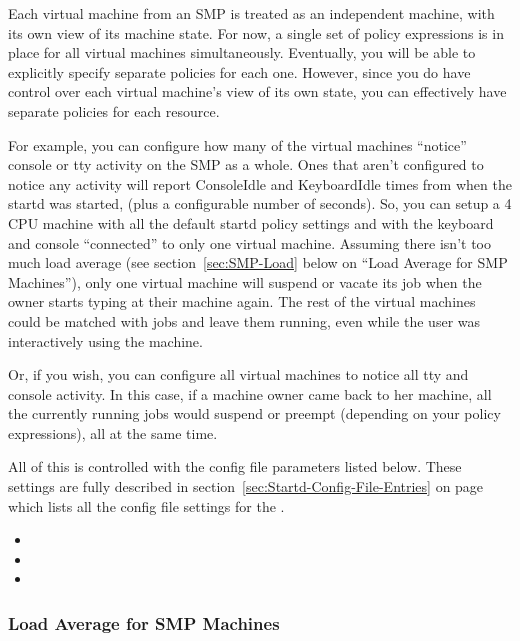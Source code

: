 Each virtual machine from an SMP is treated as an independent machine,
with its own view of its machine state.
For now, a single set of policy expressions is in place for all
virtual machines simultaneously.  
Eventually, you will be able to explicitly specify separate policies
for each one.
However, since you do have control over each virtual machine's view of
its own state, you can effectively have separate policies for each
resource.

For example, you can configure how many of the virtual machines
``notice'' console or tty activity on the SMP as a whole.
Ones that aren't configured to notice any activity will report
ConsoleIdle and KeyboardIdle times from when the startd was started,
(plus a configurable number of seconds).
So, you can setup a 4 CPU machine with all the default startd policy
settings and with the keyboard and console ``connected'' to only one
virtual machine.
Assuming there isn't too much load average (see
section~\ref{sec:SMP-Load} below on ``Load Average for SMP
Machines''), only one virtual machine will suspend or vacate its job
when the owner starts typing at their machine again.
The rest of the virtual machines could be matched with jobs and leave
them running, even while the user was interactively using the
machine. 

Or, if you wish, you can configure all virtual machines to notice all
tty and console activity.
In this case, if a machine owner came back to her machine, all the
currently running jobs would suspend or preempt (depending on your
policy expressions), all at the same time.

All of this is controlled with the config file parameters listed
below.    
These settings are fully described in
section~\ref{sec:Startd-Config-File-Entries} on
page~\pageref{sec:Startd-Config-File-Entries} which lists all the
config file settings for the .

\begin{itemize}
\item {}
\item {}
\item {}
\end{itemize}


\subsubsection{\label{sec:SMP-Load}
Load Average for SMP Machines}

